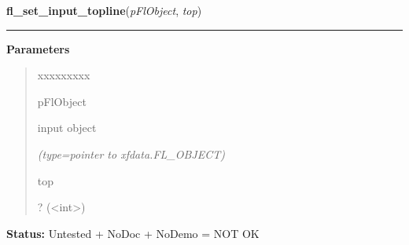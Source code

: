 \hspace{.8\funcindent}\begin{boxedminipage}{\funcwidth}

    \raggedright \textbf{fl\_set\_input\_topline}(\textit{pFlObject}, \textit{top})

    \vspace{-1.5ex}

    \rule{\textwidth}{0.5\fboxrule}
\setlength{\parskip}{2ex}
\setlength{\parskip}{1ex}
      \textbf{Parameters}
      \vspace{-1ex}

      \begin{quote}
        \begin{Ventry}{xxxxxxxxx}

          \item[pFlObject]

          input object

            {\it (type=pointer to xfdata.FL\_OBJECT)}

          \item[top]

          ? ({\textless}int{\textgreater})

        \end{Ventry}

      \end{quote}

\textbf{Status:} Untested + NoDoc + NoDemo = NOT OK



    \end{boxedminipage}

    \label{xformslib:flinput:fl_set_input_scrollbarsize}

    \vspace{0.5ex}

